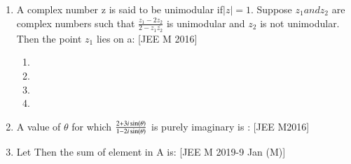 \documentclass[journal,12pt,twocolumn,article]{IEEEtran}
\theoremstyle{remark}
\begin{document}
\begin{enumerate}[start = 14]
\begin{enumerate}
\item {}

\end{enumerate}

\item A complex number z is said to be unimodular if$|z|=1$. Suppose $z_1 and z_2$ are complex numbers such that $\frac{z_1 -2z_2}{2-z_1\overline{z_2}}$ is unimodular and $z_2$ is not unimodular. Then the point $z_1$ lies on a:                                
\hfill{[JEE M 2016]}                               

\begin{enumerate}                                  
                              
\item {}
                             
\item {}

\item {} 

\item {}

\end{enumerate}

\item A value of $\theta$ for which $\frac{2+3i\sin\left(\theta\right)}{1-2i\sin\left(\theta\right)}$ is purely imaginary is :      
\hfill{[JEE M2016]}

\begin{enumerate}
\end{enumerate}                                     

\item Let   Then the sum of element in A is:
\hfill{[JEE M 2019-9 Jan (M)]}
\begin{enumerate}
\end{enumerate}


\end{enumerate}
\end{document}
